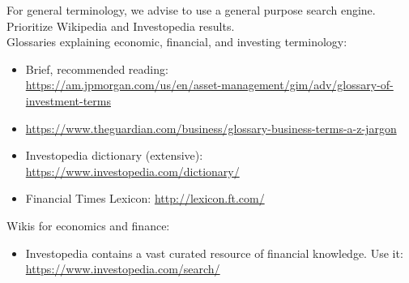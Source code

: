 {For general terminology, we advise to use a general purpose search engine.
Prioritize Wikipedia and Investopedia results.\\

\noindent
Glossaries explaining economic, financial, and investing terminology:
\begin{itemize}[noitemsep, leftmargin=*]
    \item Brief, recommended reading:\\ \url{https://am.jpmorgan.com/us/en/asset-management/gim/adv/glossary-of-investment-terms}
    \item \url{https://www.theguardian.com/business/glossary-business-terms-a-z-jargon}
    \item Investopedia dictionary (extensive): \url{https://www.investopedia.com/dictionary/}
    \item Financial Times Lexicon: \url{http://lexicon.ft.com/}
\end{itemize}

\noindent
Wikis for economics and finance:
\begin{itemize}[noitemsep, leftmargin=*]
    \item Investopedia contains a vast curated resource of financial knowledge. Use it:\\
    \url{https://www.investopedia.com/search/}
\end{itemize}

}